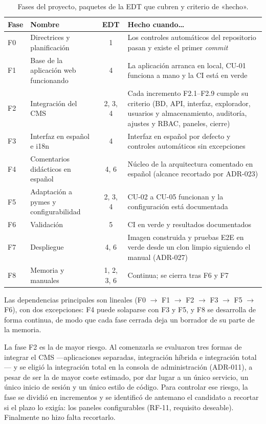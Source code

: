 \begin{table}[htbp]
  \centering
  \small
  \caption{Fases del proyecto, paquetes de la EDT que cubren y criterio de «hecho».}
  \label{tab:plan-fases}
  \begin{tabularx}{\textwidth}{@{}l>{\raggedright\arraybackslash}p{3.4cm}cX@{}}
    \toprule
    \textbf{Fase} & \textbf{Nombre} & \textbf{EDT} & \textbf{Hecho cuando\ldots} \\
    \midrule
    F0 & Directrices y planificación & 1 & Los controles automáticos del repositorio pasan y existe el primer \textit{commit} \\
    F1 & Base de la aplicación web funcionando & 4 & La aplicación arranca en local, CU-01 funciona a mano y la CI está en verde \\
    F2 & Integración del CMS & 2, 3, 4 & Cada incremento F2.1--F2.9 cumple su criterio (BD, API, interfaz, explorador, usuarios y almacenamiento, auditoría, ajustes y RBAC, paneles, cierre) \\
    F3 & Interfaz en español e i18n & 4 & Interfaz en español por defecto y controles automáticos sin excepciones \\
    F4 & Comentarios didácticos en español & 4, 6 & Núcleo de la arquitectura comentado en español (alcance recortado por ADR-023) \\
    F5 & Adaptación a pymes y configurabilidad & 2, 3, 4 & CU-02 a CU-05 funcionan y la configuración está documentada \\
    F6 & Validación & 5 & CI en verde y resultados documentados \\
    F7 & Despliegue & 4, 6 & Imagen construida y pruebas E2E en verde desde un clon limpio siguiendo el manual (ADR-027) \\
    F8 & Memoria y manuales & 1, 2, 3, 6 & Continua; se cierra tras F6 y F7 \\
    \bottomrule
  \end{tabularx}
\end{table}

Las dependencias principales son lineales (F0 $\rightarrow$ F1 $\rightarrow$
F2 $\rightarrow$ F3 $\rightarrow$ F5 $\rightarrow$ F6), con dos excepciones: F4
puede solaparse con F3 y F5, y F8 se desarrolla de forma continua, de modo que
cada fase cerrada deja un borrador de su parte de la memoria.

La fase F2 es la de mayor riesgo. Al comenzarla se evaluaron tres formas de
integrar el CMS ---aplicaciones separadas, integración híbrida e integración
total--- y se eligió la integración total en la consola de administración
(ADR-011), a pesar de ser la de mayor coste estimado, por dar lugar a un único
servicio, un único inicio de sesión y un único estilo de código. Para
controlar ese riesgo, la fase se dividió en incrementos y se identificó de
antemano el candidato a recortar si el plazo lo exigía: los paneles
configurables (RF-11, requisito deseable). Finalmente no hizo falta
recortarlo.

